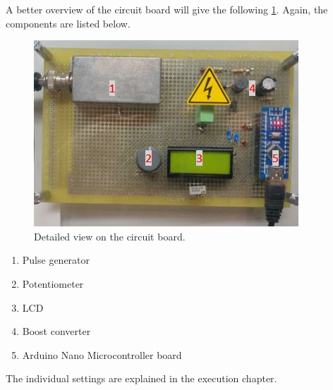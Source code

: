     A better overview of the circuit board will give the following \cref{fig:circuit_board}. Again, the components are listed
    below.
    \begin{figure}[h]
        \centering
            \includegraphics[width=.6\textwidth]{aufbau/circuit_board_num.JPG}
        \caption{Detailed view on the circuit board.}  
        \label{fig:circuit_board}
    \end{figure}
    \begin{enumerate}
        \item Pulse generator
        \item Potentiometer
        \item LCD
        \item Boost converter
        \item Arduino Nano Microcontroller board
    \end{enumerate}
    The individual settings are explained in the execution chapter.